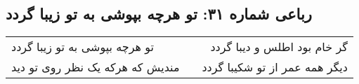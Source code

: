 \begin{center}
\section*{رباعی شماره ۳۱: تو هرچه بپوشی به تو زیبا گردد}
\label{sec:031}
\begin{longtable}{l p{0.5cm} r}
تو هرچه بپوشی به تو زیبا گردد
&&
گر خام بود اطلس و دیبا گردد
\\
مندیش که هرکه یک نظر روی تو دید
&&
دیگر همه عمر از تو شکیبا گردد
\\
\end{longtable}
\end{center}
